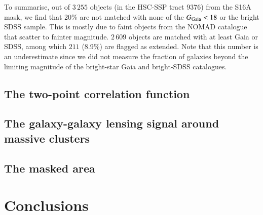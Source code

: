 \documentclass[11pt,a4paper,oneside,final]{scrartcl}
\begin{document}
To summarise, out of $3\,255$ objects (in the HSC-SSP tract 9376) from the S16A mask, we find that 20\% are not matched with none of the $G_{\rm Gaia} < 18$ or the bright SDSS sample. This is mostly due to faint objects from the NOMAD catalogue that scatter to fainter magnitude. $2\,609$ objects are matched with at least Gaia or SDSS, among which $211$ (8.9\%) are flagged as extended. Note that this number is an underestimate since we did not measure the fraction of galaxies beyond the limiting magnitude of the bright-star Gaia and bright-SDSS catalogues.

\subsection{The two-point correlation function}

\subsection{The galaxy-galaxy lensing signal around massive clusters}

\subsection{The masked area}




\section{Conclusions}
\label{sec:conclusions}





\end{document}
